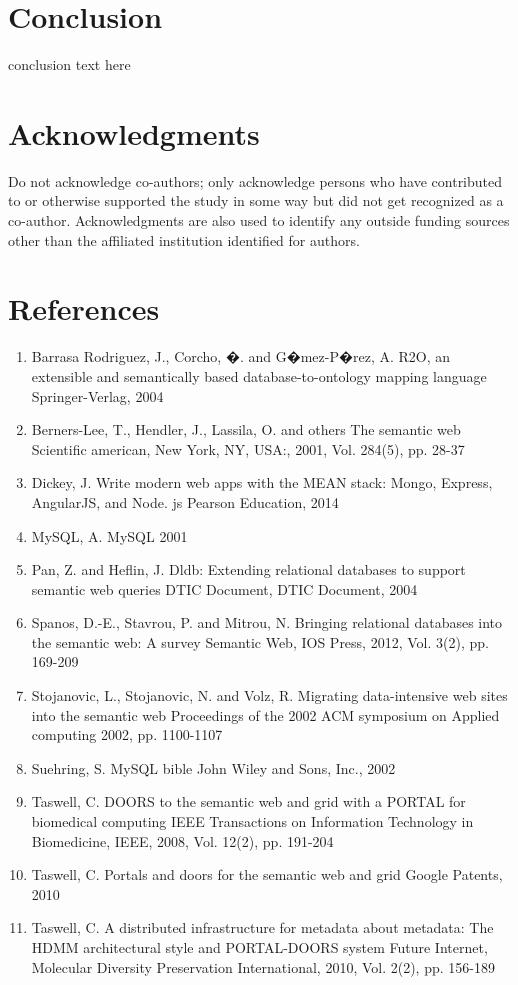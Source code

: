 \documentclass[10pt,twocolumn,twoside]{article}
\begin{document}
\section*{Conclusion}
\label{secConclusion}
conclusion text here


\section*{Acknowledgments}
Do not acknowledge co-authors; only acknowledge persons who have contributed
to or otherwise supported the study in some way but did not get recognized as a co-author.
Acknowledgments are also used to identify any outside funding sources other than
the affiliated institution identified for authors.


\section{References}
\begin{enumerate}
\item Barrasa Rodriguez, J., Corcho, �. and G�mez-P�rez, A.
R2O, an extensible and semantically based database-to-ontology mapping language
Springer-Verlag, 2004
\item Berners-Lee, T., Hendler, J., Lassila, O. and others
The semantic web
Scientific american, New York, NY, USA:, 2001, Vol. 284(5), pp. 28-37
\item Dickey, J.
Write modern web apps with the MEAN stack: Mongo, Express, AngularJS, and Node. js
Pearson Education, 2014
\item MySQL, A.
MySQL
2001
\item Pan, Z. and Heflin, J.
Dldb: Extending relational databases to support semantic web queries
DTIC Document, DTIC Document, 2004
\item Spanos, D.-E., Stavrou, P. and Mitrou, N.
Bringing relational databases into the semantic web: A survey
Semantic Web, IOS Press, 2012, Vol. 3(2), pp. 169-209
\item Stojanovic, L., Stojanovic, N. and Volz, R.
Migrating data-intensive web sites into the semantic web
Proceedings of the 2002 ACM symposium on Applied computing
2002, pp. 1100-1107
\item Suehring, S.
MySQL bible
John Wiley and Sons, Inc., 2002
\item Taswell, C.
DOORS to the semantic web and grid with a PORTAL for biomedical computing
IEEE Transactions on Information Technology in Biomedicine, IEEE, 2008, Vol. 12(2), pp. 191-204
\item Taswell, C.
Portals and doors for the semantic web and grid
Google Patents, 2010
\item Taswell, C.
A distributed infrastructure for metadata about metadata: The HDMM architectural style and PORTAL-DOORS system
Future Internet, Molecular Diversity Preservation International, 2010, Vol. 2(2), pp. 156-189
\end{enumerate}


\nocite{*}


\end{document}
